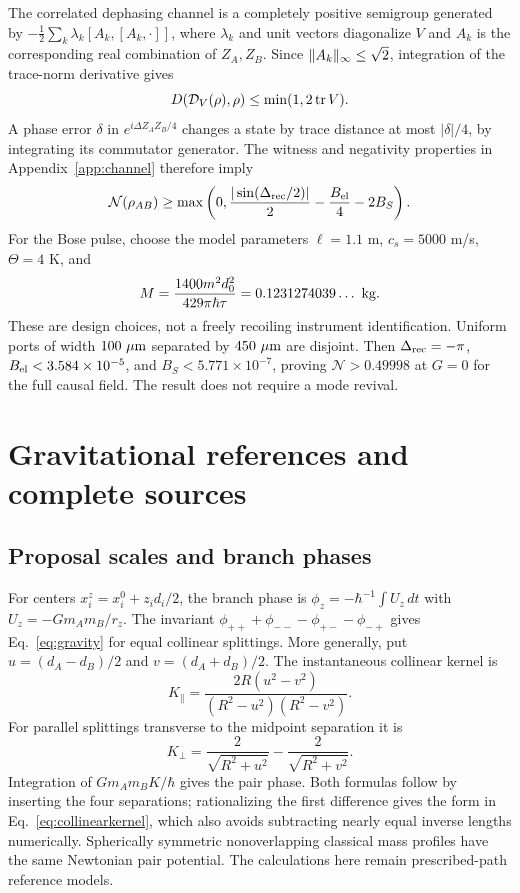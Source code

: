The correlated dephasing channel is a completely positive semigroup generated by $-\tfrac12\sum_k\lambda_k[A_k,[A_k,\cdot]]$, where $\lambda_k$ and unit vectors diagonalize $V$ and $A_k$ is the corresponding real combination of $Z_A,Z_B$. Since $\lVert A_k\rVert_\infty\le\sqrt2$, integration of the trace-norm derivative gives
\begin{equation}
D(\DV(\rho),\rho)\le\min(1,2\tr V).
\label{eq:dephasingbound}
\end{equation}
A phase error $\delta$ in $e^{i\Delta Z_AZ_B/4}$ changes a state by trace distance at most $|\delta|/4$, by integrating its commutator generator. The witness and negativity properties in Appendix~\ref{app:channel} therefore imply
\begin{equation}
\mathcal N(\rho_{AB})\ge\max\left(0,\frac{|\sin(\Delta_{\rm rec}/2)|}{2}-\frac{B_{\rm el}}4-2B_S\right).
\label{eq:negativitybound}
\end{equation}
For the Bose pulse, choose the model parameters $\ell=1.1$ m, $c_s=5000$ m/s, $\Theta=4$ K, and
\begin{equation}
M=\frac{1400m^2d_0^2}{429\pi\hbar\tau}=0.1231274039\ldots\ {\rm kg}.
\label{eq:freemass}
\end{equation}
These are design choices, not a freely recoiling instrument identification. Uniform ports of width $100\ \mu{\rm m}$ separated by $450\ \mu{\rm m}$ are disjoint. Then $\Delta_{\rm rec}=-\pi$, $B_{\rm el}<3.584\times10^{-5}$, and $B_S<5.771\times10^{-7}$, proving $\mathcal N>0.49998$ at $G=0$ for the full causal field. The result does not require a mode revival.

\section{Gravitational references and complete sources}\label{app:gravity}
\subsection{Proposal scales and branch phases}
For centers $x_i^z=x_i^0+z_id_i/2$, the branch phase is $\phi_z=-\hbar^{-1}\int U_z\,dt$ with $U_z=-Gm_Am_B/r_z$. The invariant $\phi_{++}+\phi_{--}-\phi_{+-}-\phi_{-+}$ gives Eq.~\eqref{eq:gravity} for equal collinear splittings. More generally, put $u=(d_A-d_B)/2$ and $v=(d_A+d_B)/2$. The instantaneous collinear kernel is
\begin{equation}
K_\parallel=\frac{2R(u^2-v^2)}{(R^2-u^2)(R^2-v^2)}.
\label{eq:collinearkernel}
\end{equation}
For parallel splittings transverse to the midpoint separation it is
\begin{equation}
K_\perp=\frac2{\sqrt{R^2+u^2}}-\frac2{\sqrt{R^2+v^2}}.
\label{eq:transversekernel}
\end{equation}
Integration of $Gm_Am_BK/\hbar$ gives the pair phase. Both formulas follow by inserting the four separations; rationalizing the first difference gives the form in Eq.~\eqref{eq:collinearkernel}, which also avoids subtracting nearly equal inverse lengths numerically. Spherically symmetric nonoverlapping classical mass profiles have the same Newtonian pair potential. The calculations here remain prescribed-path reference models.

